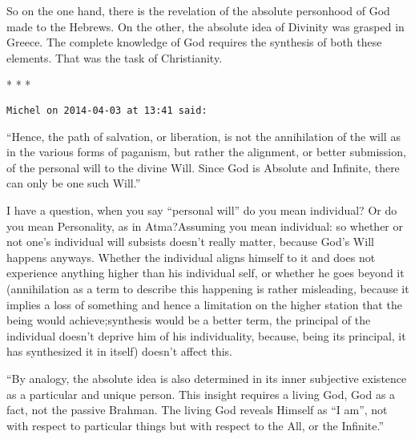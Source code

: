 So on the one hand, there is the revelation of the absolute personhood of God made to the Hebrews. On the other, the absolute idea of Divinity was grasped in Greece. The complete knowledge of God requires the synthesis of both these elements. That was the task of Christianity.


\hfill


\begin{center}* * *\end{center}

\begin{footnotesize}\begin{sffamily}

\texttt{Michel on 2014-04-03 at 13:41 said: }

“Hence, the path of salvation, or liberation, is not the annihilation of the will as in the various forms of paganism, but rather the alignment, or better submission, of the personal will to the divine Will. Since God is Absolute and Infinite, there can only be one such Will.”

I have a question, when you say “personal will” do you mean individual? Or do you mean Personality, as in Atma?Assuming you mean individual: so whether or not one's individual will subsists doesn't really matter, because God's Will happens anyways. Whether the individual aligns himself to it and does not experience anything higher than his individual self, or whether he goes beyond it (annihilation as a term to describe this happening is rather misleading, because it implies a loss of something and hence a limitation on the higher station that the being would achieve;synthesis would be a better term, the principal of the individual doesn't deprive him of his individuality, because, being its principal, it has synthesized it in itself) doesn't affect this. 

“By analogy, the absolute idea is also determined in its inner subjective existence as a particular and unique person. This insight requires a living God, God as a fact, not the passive Brahman. The living God reveals Himself as “I am”, not with respect to particular things but with respect to the All, or the Infinite.”


\end{sffamily}
\end{footnotesize}
